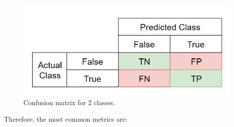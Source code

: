     \begin{figure}[H]
        \centering
        \includegraphics[scale = 0.4]{Images/2dconfusion.png}
        \caption{Confusion matrix for 2 classes.}
        \label{2classmatrix}
    \end{figure}
    
    Therefore, the most common metrics are: \\
    
